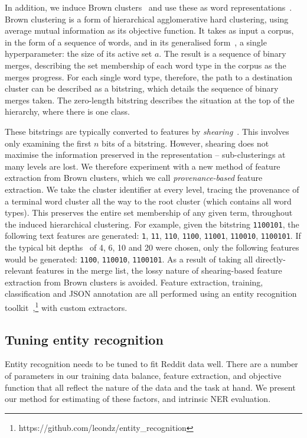 \documentclass[10pt,journal,compsoc]{IEEEtran}
\begin{document}
In addition, we induce Brown clusters~\cite{brown1992class} and use these as word representations~\cite{turian2009preliminary}.
Brown clustering is a form of hierarchical agglomerative hard clustering, using average mutual information as its objective function.
It takes as input a corpus, in the form of a sequence of words, and in its generalised form~\cite{derczynski2016generalised}, a single hyperparameter: the size of its active set $a$.
The result is a sequence of binary merges, describing the set membership of each word type in the corpus as the merges progress.
For each single word type, therefore, the path to a destination cluster can be described as a bitstring, which details the sequence of binary merges taken.
The zero-length bitstring describes the situation at the top of the hierarchy, where there is one class.

These bitstrings are typically converted to features by \emph{shearing}~\cite{derczynski2016generalised}.
This involves only examining the first $n$ bits of a bitstring.
However, shearing does not maximise the information preserved in the representation -- sub-clusterings at many levels are lost.
We therefore experiment with a new method of feature extraction from Brown clusters, which we call {\em provenance-based} feature extraction.
We take the cluster identifier at every level, tracing the provenance of a terminal word cluster all the way to the root cluster (which contains all word types).
This preserves the entire set membership of any given term, throughout the induced hierarchical clustering.
For example, given the bitstring {\tt 1100101}, the following text features are generated: {\tt 1}, {\tt 11}, {\tt 110}, {\tt 1100}, {\tt 11001}, {\tt 110010}, {\tt 1100101}.
If the typical bit depths~\cite{ratinov2009design} of 4, 6, 10 and 20 were chosen, only the following features would be generated: {\tt 1100}, {\tt 110010}, {\tt 1100101}.
As a result of taking all directly-relevant features in the merge list, the lossy nature of shearing-based feature extraction from Brown clusters is avoided.
Feature extraction, training, classification and JSON annotation are all performed using an entity recognition toolkit~\cite{derczynski2015usfd},\footnote{https://github.com/leondz/entity\_recognition} with custom extractors.


\subsection{Tuning entity recognition}

Entity recognition needs to be tuned to fit Reddit data well.
There are a number of parameters in our training data balance, feature extraction, and objective function that all reflect the nature of the data and the task at hand.
We present our method for estimating of these factors, and intrinsic NER evaluation.
\end{document}
